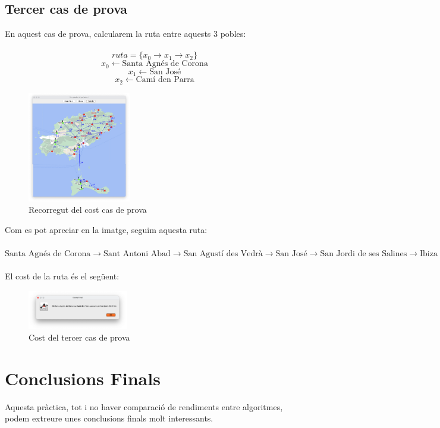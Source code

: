 \documentclass[conference]{IEEEtran}
\begin{document}
    \subsection{Tercer cas de prova}
    En aquest cas de prova, calcularem la ruta entre aquests 3 pobles:\\\\
    $$ruta=\{x_{0}\rightarrow x_{1}\rightarrow x_{2}\}$$
    $$x_{0}\gets \textrm{Santa Agnés de Corona}$$
    $$x_{1}\gets \textrm{San José}$$
    $$x_{2}\gets \textrm{Camí den Parra}$$

    \begin{figure}[ht]
        \centering
        \includegraphics[width=0.4\textwidth]{images/cami_3.png}
        \caption{Recorregut del cost cas de prova}
    \end{figure}

    Com es pot apreciar en la imatge, seguim aquesta ruta:\\\\
    $\textrm{Santa Agnés de Corona} \rightarrow \textrm{Sant Antoni Abad} \rightarrow \textrm{San Agustí des Vedrà} \rightarrow \textrm{San José} \rightarrow \textrm{San Jordi de ses Salines} \rightarrow \textrm{Ibiza}\rightarrow \textrm{La Savina} \rightarrow \textrm{Camí den Parra}$\\\\
    El cost de la ruta és el següent:
    \begin{figure}[ht]
        \centering
        \includegraphics[width=0.388\textwidth]{images/cost_3.png}
        \caption{Cost del tercer cas de prova}
    \end{figure}

\section{Conclusions Finals}
    Aquesta pràctica, tot i no haver comparació de rendiments entre algoritmes, podem extreure unes conclusions finals molt interessants.\\
\end{document}
